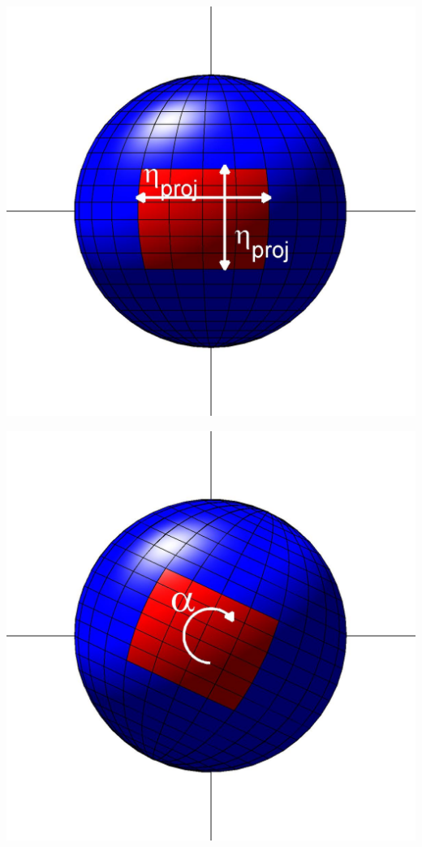 \documentclass[12pt]{minimal}
\begin{document}
\begin{minipage}{0.22\textwidth}
\centering
\includegraphics[width=\textwidth]{sphere2_1}\\
\end{minipage}
%
\hfill
%
\begin{minipage}{0.22\textwidth}
\centering
\includegraphics[width=\textwidth]{sphere2_2}\\
\end{minipage}
\end{document}
